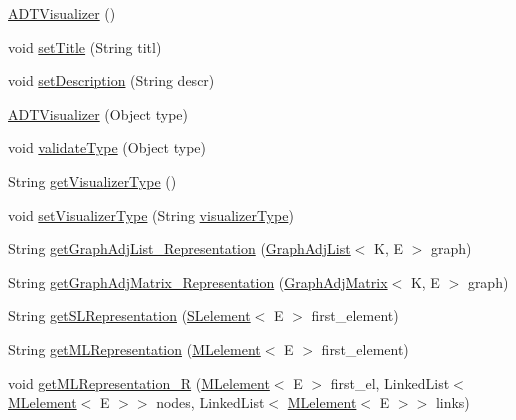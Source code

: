 \begin{DoxyCompactItemize}
\item 
\hyperlink{classbridges_1_1base_1_1_a_d_t_visualizer_a3d5098e4c0609c19a547f19f0d538eeb}{A\+D\+T\+Visualizer} ()
\item 
void \hyperlink{classbridges_1_1base_1_1_a_d_t_visualizer_ab0fda74356fefe16f5b3b98a5fce1f9e}{set\+Title} (String titl)
\item 
void \hyperlink{classbridges_1_1base_1_1_a_d_t_visualizer_ab00d1c82e11326ce68c0146bc393c4b1}{set\+Description} (String descr)
\item 
\hyperlink{classbridges_1_1base_1_1_a_d_t_visualizer_af722d7ea9506b1ca8119ae39c43130ff}{A\+D\+T\+Visualizer} (Object type)
\item 
void \hyperlink{classbridges_1_1base_1_1_a_d_t_visualizer_a991fc08ab102bc0f861e0aefe75282e7}{validate\+Type} (Object type)
\item 
String \hyperlink{classbridges_1_1base_1_1_a_d_t_visualizer_aea37161ff4b74fbeae6f478b4c2e1a50}{get\+Visualizer\+Type} ()
\item 
void \hyperlink{classbridges_1_1base_1_1_a_d_t_visualizer_a5f423ff4295f3ae4371c86d4ab45638c}{set\+Visualizer\+Type} (String \hyperlink{classbridges_1_1base_1_1_a_d_t_visualizer_a288aece657b5641f48e839b34f3884b9}{visualizer\+Type})
\item 
String \hyperlink{classbridges_1_1base_1_1_a_d_t_visualizer_a0b923e3a1afd3d56b5c42ef39e4c5542}{get\+Graph\+Adj\+List\+\_\+\+Representation} (\hyperlink{classbridges_1_1base_1_1_graph_adj_list}{Graph\+Adj\+List}$<$ K, E $>$ graph)
\item 
String \hyperlink{classbridges_1_1base_1_1_a_d_t_visualizer_a7e3ecfc9522596bd12f0adef694eacf2}{get\+Graph\+Adj\+Matrix\+\_\+\+Representation} (\hyperlink{classbridges_1_1base_1_1_graph_adj_matrix}{Graph\+Adj\+Matrix}$<$ K, E $>$ graph)
\item 
String \hyperlink{classbridges_1_1base_1_1_a_d_t_visualizer_a8bfd44ca6eef7b19feb6061cb7e141ef}{get\+S\+L\+Representation} (\hyperlink{classbridges_1_1base_1_1_s_lelement}{S\+Lelement}$<$ E $>$ first\+\_\+element)
\item 
String \hyperlink{classbridges_1_1base_1_1_a_d_t_visualizer_a27fa70e9eaeb169697fac3ad8cb8a0ec}{get\+M\+L\+Representation} (\hyperlink{classbridges_1_1base_1_1_m_lelement}{M\+Lelement}$<$ E $>$ first\+\_\+element)
\item 
void \hyperlink{classbridges_1_1base_1_1_a_d_t_visualizer_a1619f140d9a1d46f83c0881f6380286b}{get\+M\+L\+Representation\+\_\+R} (\hyperlink{classbridges_1_1base_1_1_m_lelement}{M\+Lelement}$<$ E $>$ first\+\_\+el, Linked\+List$<$ \hyperlink{classbridges_1_1base_1_1_m_lelement}{M\+Lelement}$<$ E $>$$>$ nodes, Linked\+List$<$ \hyperlink{classbridges_1_1base_1_1_m_lelement}{M\+Lelement}$<$ E $>$$>$ links)

\end{DoxyCompactItemize}
